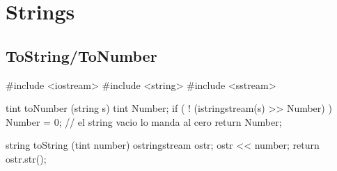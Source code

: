 \section{Strings}

\subsection{ToString/ToNumber}
\begin{code}
#include <iostream>
#include <string>
#include <sstream>

tint toNumber (string s)
{
	tint Number;
	if ( ! (istringstream(s) >> Number) )
		Number = 0; // el string vacio lo manda al cero
	return Number;
}

string toString (tint number)
{    
    ostringstream ostr;
    ostr << number;
    return  ostr.str();
}
\end{code}


